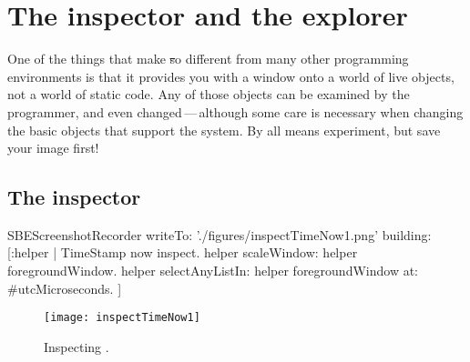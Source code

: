 \documentclass[a4paper,10pt,twoside]{book}
\begin{document}
\begin{comment}
One of the most important functions for a version management tool is to let the user build a package out of a number of smaller packages.
For example, a complex package like refactoring support might be made up of the refactoring engine itself, a GUI, and the services interface that makes it accessible to other tools.
Each of these components goes in its own package, and yet,  for the convenience of the user, the whole needs to be available as a single package.

How is this accomplished using Monticello?  \ab{How indeed?  I hope that someone can write this section, because I haven't a clue, but would really like to know.}
\end{comment}

\section{The inspector and the explorer}
\label{sec:inspector} %

One of the things that make \st so different from many other programming environments is that it provides you with a window onto a world of live objects, not a world of static code.
Any of those objects can be examined by the programmer, and even changed\,---\,although some care is necessary when changing the basic objects that support the system.
By all means experiment, but save your image first!

\subsection{The inspector}


\begin{ExecuteSmalltalkScript}
SBEScreenshotRecorder writeTo: './figures/inspectTimeNow1.png' building: [:helper |
	TimeStamp now inspect.
	helper scaleWindow: helper foregroundWindow.
	helper selectAnyListIn: helper foregroundWindow at: #utcMicroseconds.
]
\end{ExecuteSmalltalkScript}
\begin{figure}[btp]
	\begin{center}
		\texttt{[image: inspectTimeNow1]}
	\end{center}
	\caption{Inspecting .}
	\label{fig:inspectTimeNow1}
\end{figure}
\end{document}
